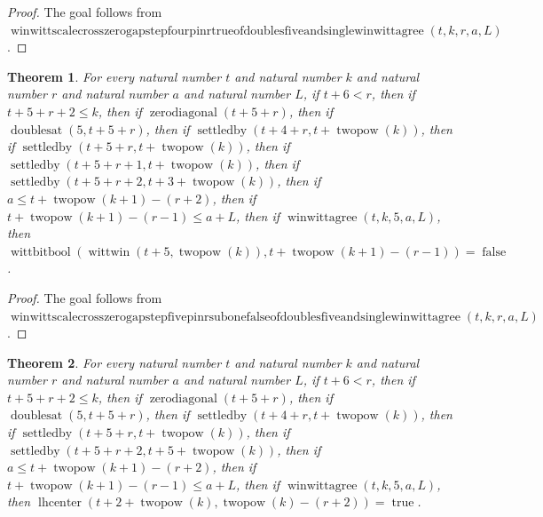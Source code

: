 \documentclass[11pt]{article}
\newtheorem{theorem}{Theorem}[section]
\theoremstyle{definition}
\begin{document}
\begin{proof}
The goal follows from \(\operatorname{winwittscalecrosszerogapstepfourpinrtrueofdoublesfiveandsinglewinwittagree}(t, k, r, a, L)\).
\end{proof}
\begin{theorem}
\label{ll:paper:winwitt-scale-cross-zero-gap-step-five-pin-r-sub-one-false-of-doubles-five-and-single-winwittagree}
For every natural number \(t\) and natural number \(k\) and natural number \(r\) and natural number \(a\) and natural number \(L\), if \(t + 6 < r\), then if \(t + 5 + r + 2 \le k\), then if \(\operatorname{zerodiagonal}(t + 5 + r)\), then if \(\operatorname{doublesat}(5, t + 5 + r)\), then if \(\operatorname{settledby}(t + 4 + r, t + \operatorname{twopow}(k))\), then if \(\operatorname{settledby}(t + 5 + r, t + \operatorname{twopow}(k))\), then if \(\operatorname{settledby}(t + 5 + r + 1, t + \operatorname{twopow}(k))\), then if \(\operatorname{settledby}(t + 5 + r + 2, t + 3 + \operatorname{twopow}(k))\), then if \(a \le t + \operatorname{twopow}(k + 1) - (r + 2)\), then if \(t + \operatorname{twopow}(k + 1) - (r - 1) \le a + L\), then if \(\operatorname{winwittagree}(t, k, 5, a, L)\), then \(\operatorname{wittbitbool}(\operatorname{wittwin}(t + 5, \operatorname{twopow}(k)), t + \operatorname{twopow}(k + 1) - (r - 1)) = \operatorname{false}\).
\end{theorem}
\begin{proof}
The goal follows from \(\operatorname{winwittscalecrosszerogapstepfivepinrsubonefalseofdoublesfiveandsinglewinwittagree}(t, k, r, a, L)\).
\end{proof}
\begin{theorem}
\label{ll:paper:lhcenter-late-cross-step-two-pin-r-plus-two-true-of-doubles-five-and-single-winwittagree}
For every natural number \(t\) and natural number \(k\) and natural number \(r\) and natural number \(a\) and natural number \(L\), if \(t + 6 < r\), then if \(t + 5 + r + 2 \le k\), then if \(\operatorname{zerodiagonal}(t + 5 + r)\), then if \(\operatorname{doublesat}(5, t + 5 + r)\), then if \(\operatorname{settledby}(t + 4 + r, t + \operatorname{twopow}(k))\), then if \(\operatorname{settledby}(t + 5 + r, t + \operatorname{twopow}(k))\), then if \(\operatorname{settledby}(t + 5 + r + 2, t + 5 + \operatorname{twopow}(k))\), then if \(a \le t + \operatorname{twopow}(k + 1) - (r + 2)\), then if \(t + \operatorname{twopow}(k + 1) - (r - 1) \le a + L\), then if \(\operatorname{winwittagree}(t, k, 5, a, L)\), then \(\operatorname{lhcenter}(t + 2 + \operatorname{twopow}(k), \operatorname{twopow}(k) - (r + 2)) = \operatorname{true}\).
\end{theorem}
\end{document}
